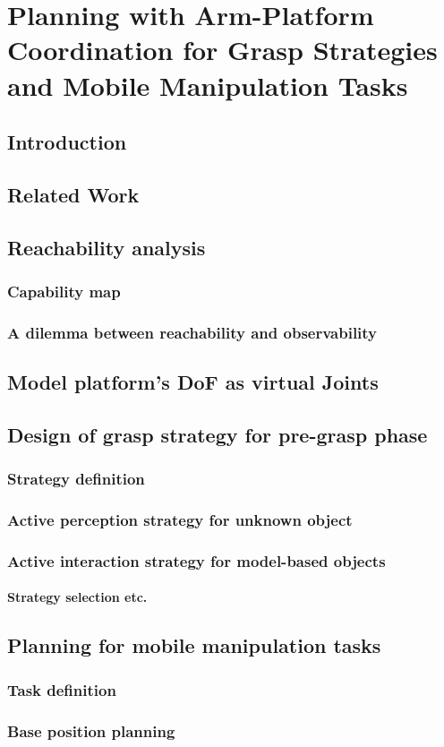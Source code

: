 \chapter{Planning with Arm-Platform Coordination for Grasp Strategies and Mobile Manipulation Tasks}
\section{Introduction}

\section{Related Work}

\section{Reachability analysis}
\subsection{Capability map}

\subsection{A dilemma between reachability and observability}

\section{Model platform's DoF as virtual Joints}

\section{Design of grasp strategy for pre-grasp phase}

\subsection{Strategy definition}

\subsection{Active perception strategy for unknown object}

\subsection{Active interaction strategy for model-based objects}

\subsubsection{Strategy selection etc.}

\section{Planning for mobile manipulation tasks}
\subsection{Task definition}
\subsection{Base position planning}

